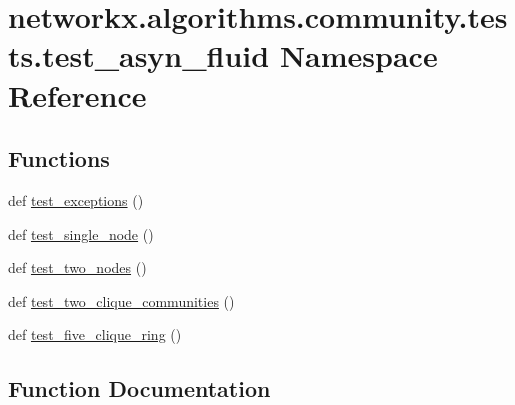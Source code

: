 \hypertarget{namespacenetworkx_1_1algorithms_1_1community_1_1tests_1_1test__asyn__fluid}{}\section{networkx.\+algorithms.\+community.\+tests.\+test\+\_\+asyn\+\_\+fluid Namespace Reference}
\label{namespacenetworkx_1_1algorithms_1_1community_1_1tests_1_1test__asyn__fluid}
\subsection*{Functions}
\begin{DoxyCompactItemize}
\item 
def \hyperlink{namespacenetworkx_1_1algorithms_1_1community_1_1tests_1_1test__asyn__fluid_ab4084ddb61747efeb9d9e22e8017ff9b}{test\+\_\+exceptions} ()
\item 
def \hyperlink{namespacenetworkx_1_1algorithms_1_1community_1_1tests_1_1test__asyn__fluid_aea8a30848690d7d1d636ed28cea593aa}{test\+\_\+single\+\_\+node} ()
\item 
def \hyperlink{namespacenetworkx_1_1algorithms_1_1community_1_1tests_1_1test__asyn__fluid_a0def42ee26908a6b1a30a14565e97425}{test\+\_\+two\+\_\+nodes} ()
\item 
def \hyperlink{namespacenetworkx_1_1algorithms_1_1community_1_1tests_1_1test__asyn__fluid_a8a835269058af06d0454454f5dfb80fe}{test\+\_\+two\+\_\+clique\+\_\+communities} ()
\item 
def \hyperlink{namespacenetworkx_1_1algorithms_1_1community_1_1tests_1_1test__asyn__fluid_a9a1b24b5dddbadddb5fee1776fec182a}{test\+\_\+five\+\_\+clique\+\_\+ring} ()
\end{DoxyCompactItemize}


\subsection{Function Documentation}
\mbox{\label{namespacenetworkx_1_1algorithms_1_1community_1_1tests_1_1test__asyn__fluid_ab4084ddb61747efeb9d9e22e8017ff9b}} 
